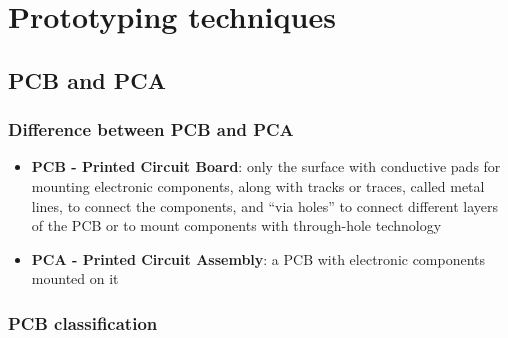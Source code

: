 \section{Prototyping techniques}
\subsection{PCB and PCA}
\subsubsection*{Difference between PCB and PCA}
\begin{itemize}
	\item \textbf{PCB - Printed Circuit Board}: only the surface with conductive pads for mounting electronic components, along
	with tracks or traces, called metal lines, to connect the components, and ``via holes'' to connect different layers of the
	PCB or to mount components with through-hole technology
	\item \textbf{PCA - Printed Circuit Assembly}: a PCB with electronic components mounted on it
\end{itemize}

\subsubsection*{PCB classification}

